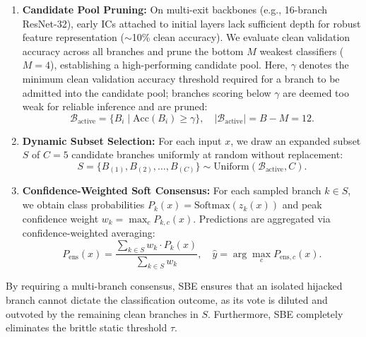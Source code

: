 \documentclass[conference,10pt]{IEEEtran}
\begin{document}
\begin{enumerate}
    \item \textbf{Candidate Pool Pruning:} On multi-exit backbones (e.g., 16-branch ResNet-32), early ICs attached to initial layers lack sufficient depth for robust feature representation ($\sim$10\% clean accuracy). We evaluate clean validation accuracy across all branches and prune the bottom $M$ weakest classifiers ($M = 4$), establishing a high-performing candidate pool. Here, $\gamma$ denotes the minimum clean validation accuracy threshold required for a branch to be admitted into the candidate pool; branches scoring below $\gamma$ are deemed too weak for reliable inference and are pruned:
    \begin{equation}
        \mathcal{B}_{\text{active}} = \{B_i \mid \text{Acc}(B_i) \ge \gamma\}, \quad |\mathcal{B}_{\text{active}}| = B - M = 12.
    \end{equation}
    \item \textbf{Dynamic Subset Selection:} For each input $x$, we draw an expanded subset $S$ of $C = 5$ candidate branches uniformly at random without replacement:
    \begin{equation}
        S = \{B_{(1)}, B_{(2)}, \dots, B_{(C)}\} \sim \text{Uniform}(\mathcal{B}_{\text{active}}, C).
    \end{equation}
    \item \textbf{Confidence-Weighted Soft Consensus:} For each sampled branch $k \in S$, we obtain class probabilities $P_k(x) = \text{Softmax}(z_k(x))$ and peak confidence weight $w_k = \max_c P_{k, c}(x)$. Predictions are aggregated via confidence-weighted averaging:
    \begin{equation}
        P_{\text{ens}}(x) = \frac{\sum_{k \in S} w_k \cdot P_k(x)}{\sum_{k \in S} w_k}, \quad \hat{y} = \arg\max_{c} P_{\text{ens}, c}(x).
    \end{equation}
\end{enumerate}
By requiring a multi-branch consensus, SBE ensures that an isolated hijacked branch cannot dictate the classification outcome, as its vote is diluted and outvoted by the remaining clean branches in $S$. Furthermore, SBE completely eliminates the brittle static threshold $\tau$.
\end{document}
